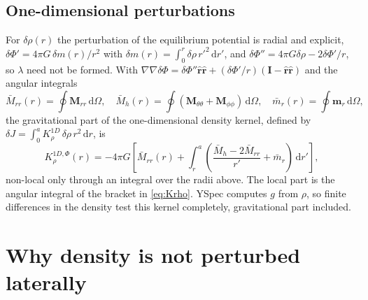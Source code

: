 \documentclass[11pt,a4paper]{article}
\newcommand{\br}{\hat{\mathbf{r}}}
\newcommand{\bM}{\mathbf{M}}
\newcommand{\vm}{\mathbf{m}}
\newcommand{\bI}{\mathbf{I}}
\newcommand{\dd}{\,\mathrm{d}}
\theoremstyle{remark}
\begin{document}
\subsection{One-dimensional perturbations}\label{sec:lambda1d}

For $\delta\rho(r)$ the perturbation of the equilibrium potential is radial
and explicit, $\delta\Phi' = 4\pi G\,\delta m(r)/r^2$ with $\delta m(r)
=\int_0^r\delta\rho\,r'^2\dd r'$, and $\delta\Phi'' = 4\pi G\delta\rho -
2\delta\Phi'/r$, so $\lambda$ need not be formed. With
$\nabla\nabla\delta\Phi = \delta\Phi''\br\br + (\delta\Phi'/r)
(\bI-\br\br)$ and the angular integrals
\begin{equation}
  \bar M_{rr}(r) = \oint\bM_{rr}\dd\Omega, \quad
  \bar M_h(r) = \oint(\bM_{\theta\theta}+\bM_{\phi\phi})\dd\Omega, \quad
  \bar m_r(r) = \oint\vm_r\dd\Omega,
\end{equation}
the gravitational part of the one-dimensional density kernel, defined by
$\delta J = \int_0^aK^{1D}_\rho\,\delta\rho\,r^2\dd r$, is
\begin{equation}
  K^{1D,\Phi}_\rho(r) = -4\pi G\left[\bar M_{rr}(r) + \int_r^a
  \left(\frac{\bar M_h - 2\bar M_{rr}}{r'} + \bar m_r\right)\dd r'\right],
\end{equation}
non-local only through an integral over the radii above. The local part is
the angular integral of the bracket in \eqref{eq:Krho}. YSpec computes $g$
from $\rho$, so finite differences in the density test this kernel
completely, gravitational part included.

\section{Why density is not perturbed laterally}\label{sec:lateral}
\end{document}

